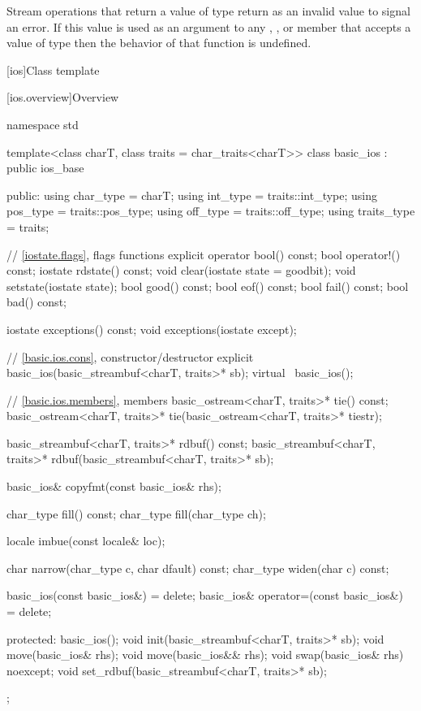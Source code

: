 \pnum
Stream operations that return a value of type
return
as an invalid value to signal an error.
If this value is used as an argument to any
,
,
or
 member
that accepts a value of type
then the behavior of that function is undefined.
%

[ios]{Class template }

[ios.overview]{Overview}

%
\begin{codeblock}
namespace std {
  template<class charT, class traits = char_traits<charT>>
  class basic_ios : public ios_base {
  public:
    using char_type   = charT;
    using int_type    = traits::int_type;
    using pos_type    = traits::pos_type;
    using off_type    = traits::off_type;
    using traits_type = traits;

    // \ref{iostate.flags}, flags functions
    explicit operator bool() const;
    bool operator!() const;
    iostate rdstate() const;
    void clear(iostate state = goodbit);
    void setstate(iostate state);
    bool good() const;
    bool eof()  const;
    bool fail() const;
    bool bad()  const;

    iostate exceptions() const;
    void exceptions(iostate except);

    // \ref{basic.ios.cons}, constructor/destructor
    explicit basic_ios(basic_streambuf<charT, traits>* sb);
    virtual ~basic_ios();

    // \ref{basic.ios.members}, members
    basic_ostream<charT, traits>* tie() const;
    basic_ostream<charT, traits>* tie(basic_ostream<charT, traits>* tiestr);

    basic_streambuf<charT, traits>* rdbuf() const;
    basic_streambuf<charT, traits>* rdbuf(basic_streambuf<charT, traits>* sb);

    basic_ios& copyfmt(const basic_ios& rhs);

    char_type fill() const;
    char_type fill(char_type ch);

    locale imbue(const locale& loc);

    char      narrow(char_type c, char dfault) const;
    char_type widen(char c) const;

    basic_ios(const basic_ios&) = delete;
    basic_ios& operator=(const basic_ios&) = delete;

  protected:
    basic_ios();
    void init(basic_streambuf<charT, traits>* sb);
    void move(basic_ios& rhs);
    void move(basic_ios&& rhs);
    void swap(basic_ios& rhs) noexcept;
    void set_rdbuf(basic_streambuf<charT, traits>* sb);
  };
}
\end{codeblock}

